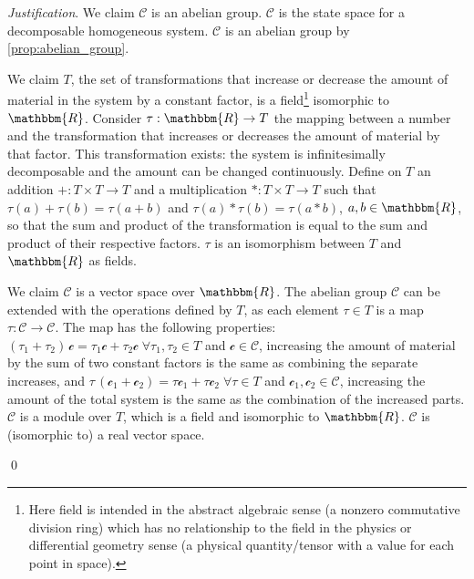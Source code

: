 \documentclass[aps,pra,10pt,twocolumn,floatfix,nofootinbib]{revtex4-1}
\numberwithin{equation}{section}
\theoremstyle{definition}
\newenvironment{justification}{\emph{Justification}.}{\qed}
\begin{document}
\begin{justification}
We claim $\mathcal{C}$ is an abelian group. $\mathcal{C}$ is the state space for a decomposable homogeneous system. $\mathcal{C}$ is an abelian group  by \ref{prop:abelian_group}.

We claim $T$, the set of transformations that increase or decrease the amount of material in the system by a constant factor, is a field\footnote{Here field is intended in the abstract algebraic sense (a nonzero commutative division ring) which has no relationship to the field in the physics or differential geometry sense (a physical quantity/tensor with a value for each point in space).} isomorphic to $\mathbbm{R}$. Consider $\tau: \mathbbm{R} \rightarrow T$ the mapping between a number and the transformation that increases or decreases the amount of material by that factor. This transformation exists: the system is infinitesimally decomposable and the amount can be changed continuously. Define on $T$ an addition $+: T \times T \rightarrow T$ and a multiplication $*: T \times T \rightarrow T$ such that $\tau(a) + \tau(b) = \tau(a+b)$ and $\tau(a) * \tau(b) = \tau(a*b)$, $a,b \in \mathbbm{R}$, so that the sum and product of the transformation is equal to the sum and product of their respective factors. $\tau$ is an isomorphism between $T$ and $\mathbbm{R}$ as fields.

We claim $\mathcal{C}$ is a vector space over $\mathbbm{R}$. The abelian group $\mathcal{C}$ can be extended with the operations defined by $T$, as each element $\tau \in T$ is a map $\tau : \mathcal{C} \rightarrow \mathcal{C}$. The map has the following properties: $(\tau_1 + \tau_2) \, \mathcal{c} = \tau_1 \mathcal{c} + \tau_2 \mathcal{c} \; \forall \tau_1, \tau_2 \in T$ and $\mathcal{c} \in \mathcal{C}$, increasing the amount of material by the sum of two constant factors is the same as combining the separate increases, and $\tau \, (\mathcal{c}_1 + \mathcal{c}_2) = \tau \mathcal{c}_1 + \tau \mathcal{c}_2\; \forall \tau \in T$ and $\mathcal{c}_1, \mathcal{c}_2 \in \mathcal{C}$, increasing the amount of the total system is the same as the combination of the increased parts. $\mathcal{C}$ is a module over $T$, which is a field and isomorphic to $\mathbbm{R}$. $\mathcal{C}$ is (isomorphic to) a real vector space.


\end{justification}
\end{document}
